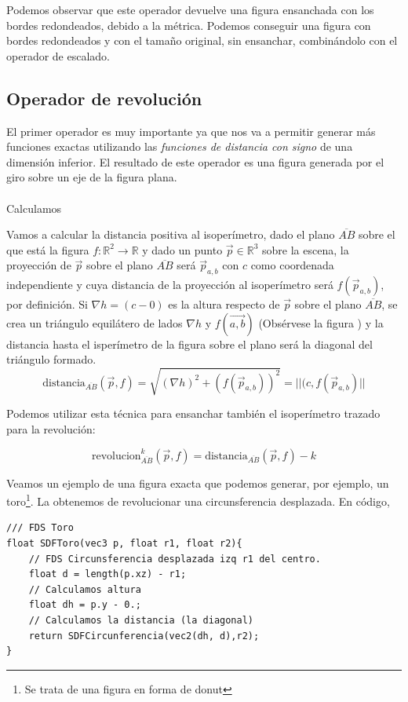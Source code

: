 Podemos observar que este operador devuelve una figura ensanchada con los bordes redondeados, debido a la métrica. Podemos conseguir una figura con bordes redondeados y con el tamaño original, sin ensanchar, combinándolo con el operador de escalado.

\subsection{Operador de revolución}
El primer operador es muy importante ya que nos va a permitir generar más funciones exactas utilizando las \textit{funciones de distancia con signo} de una dimensión inferior. El resultado de este operador es una figura generada por el giro sobre un eje de la figura plana.\\\\
Calculamos  

Vamos a calcular la distancia positiva al isoperímetro, dado el plano \(\overline{AB}\) sobre el que está la figura \(f:\mathbb{R}^2\longrightarrow\mathbb{R}\) y dado un punto \(\Vec{p}\in\mathbb{R}^3\) sobre la escena, la proyección de \(\Vec{p}\) sobre el plano \(\overline{AB}\) será \(\Vec{p}_{a,b}\) con \(c\) como coordenada independiente y cuya distancia de la proyección al isoperímetro será \(f(\Vec{p}_{a,b})\), por definición. Si \(\nabla h=(c-0)\) es la altura respecto de \(\Vec{p}\) sobre el plano \(\overline{AB}\), se crea un triángulo equilátero de lados \(\nabla h\) y \( f(\Vec{a,b})\) (Obsérvese la figura ) y la distancia  hasta el isperímetro de la figura sobre el plano será la diagonal del triángulo formado.
\[\text{distancia}_{\overline{AB}}(\Vec{p}, f)= \sqrt{(\nabla h)^2+(f(\Vec{p}_{a,b}))^2}=\vert\vert(c, f(\Vec{p}_{a,b})\vert\vert\]

Podemos utilizar esta técnica para ensanchar también el isoperímetro trazado para la revolución:

\[\text{revolucion}_{\overline{AB}}^k(\Vec{p}, f)=\text{distancia}_{\overline{AB}}(\Vec{p}, f)-k\]

Veamos un ejemplo de una figura exacta que podemos generar, por ejemplo, un toro\footnote{Se trata de una figura en forma de donut}. La obtenemos de revolucionar una circunsferencia desplazada. En código,

\begin{lstlisting}
/// FDS Toro
float SDFToro(vec3 p, float r1, float r2){
    // FDS Circunsferencia desplazada izq r1 del centro.
    float d = length(p.xz) - r1;
    // Calculamos altura
    float dh = p.y - 0.;
    // Calculamos la distancia (la diagonal)
    return SDFCircunferencia(vec2(dh, d),r2);
}
\end{lstlisting}

